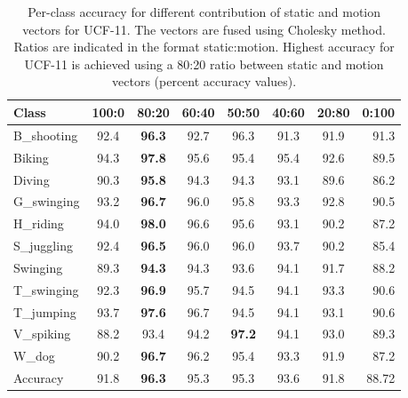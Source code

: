 \begin{table*}[]
\centering
\caption{Per-class accuracy for different contribution of static and motion vectors for UCF-11. The vectors are fused using Cholesky method. Ratios are indicated in the
format static:motion. Highest accuracy for UCF-11 is achieved using a
80:20 ratio between static and motion vectors (percent accuracy values).}\label{tbl:rho ucf}
\begin{tabular}{@{} l c c c c c c r @{}}
\toprule
Class           & 100:0  & 80:20     & 60:40   & 50:50    & 40:60     & 20:80   & 0:100 \\ \midrule \midrule
B\_shooting      & 92.4 & \textbf{96.3}   & 92.7  &  96.3  &  91.3   & 91.9  & 91.3  \\
Biking          & 94.3 &  \textbf{97.8}   & 95.6  &  95.4  &  95.4   & 92.6  & 89.5   \\
Diving          & 90.3 &  \textbf{95.8}   & 94.3  &  94.3  &  93.1   &  89.6 & 86.2  \\
G\_swinging      & 93.2 & \textbf{96.7}   &  96.0 &  95.8  &  93.3   &  92.8 & 90.5 \\
H\_riding        & 94.0 &  \textbf{98.0}   &  96.6 &  95.6  &  93.1   &  90.2 & 87.2 \\
S\_juggling      & 92.4&  \textbf{96.5}    & 96.0  &  96.0  &  93.7   &  90.2 & 85.4  \\
Swinging        & 89.3&  \textbf{94.3}    & 94.3  &  93.6  &  94.1   &  91.7 & 88.2 \\
T\_swinging      & 92.3& \textbf{96.9 }    &  95.7 &  94.5  &  94.1   &  93.3 &  90.6 \\
T\_jumping       & 93.7&  \textbf{97.6}    &  96.7 &  94.5  &  94.1   &  93.1 & 90.6 \\
V\_spiking       & 88.2&  93.4    &  94.2 &  \textbf{97.2}  &  94.1   &  93.0 & 89.3 \\
W\_dog           & 90.2&  \textbf{96.7 }   &   96.2&  95.4  &  93.3   &  91.9 & 87.2 \\  \midrule
Accuracy        &   91.8&  \textbf{96.3}    &   95.3&  95.3  &  93.6   & 91.8  & 88.72  \\ \bottomrule
\end{tabular}
\end{table*}

